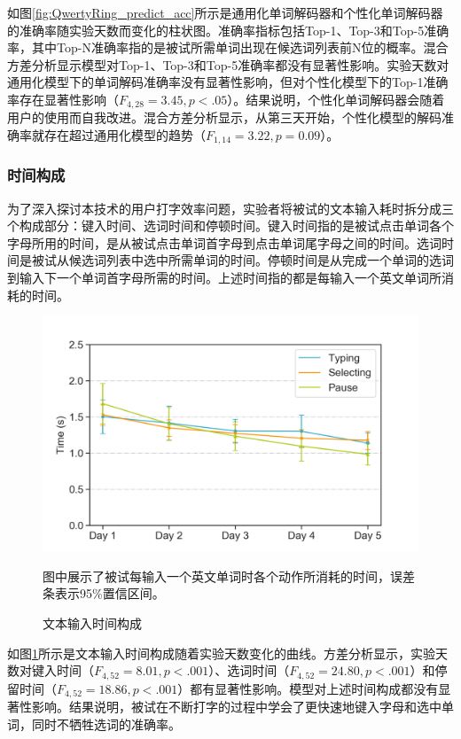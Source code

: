 如图\ref{fig:QwertyRing_predict_acc}所示是通用化单词解码器和个性化单词解码器的准确率随实验天数而变化的柱状图。准确率指标包括Top-1、Top-3和Top-5准确率，其中Top-N准确率指的是被试所需单词出现在候选词列表前N位的概率。混合方差分析显示模型对Top-1、Top-3和Top-5准确率都没有显著性影响。实验天数对通用化模型下的单词解码准确率没有显著性影响，但对个性化模型下的Top-1准确率存在显著性影响（$F_{4,28}=3.45,p<.05$）。结果说明，个性化单词解码器会随着用户的使用而自我改进。混合方差分析显示，从第三天开始，个性化模型的解码准确率就存在超过通用化模型的趋势（$F_{1,14}=3.22,p=0.09$）。

\subsubsection{时间构成}

为了深入探讨本技术的用户打字效率问题，实验者将被试的文本输入耗时拆分成三个构成部分：键入时间、选词时间和停顿时间。键入时间指的是被试点击单词各个字母所用的时间，是从被试点击单词首字母到点击单词尾字母之间的时间。选词时间是被试从候选词列表中选中所需单词的时间。停顿时间是从完成一个单词的选词到输入下一个单词首字母所需的时间。上述时间指的都是每输入一个英文单词所消耗的时间。

\begin{figure}[!htbp]
	\centering
	\includegraphics[width=0.8\linewidth]{figures/QwertyRing_time_component.png}
	\caption*{图中展示了被试每输入一个英文单词时各个动作所消耗的时间，误差条表示95\%置信区间。}
	\caption{文本输入时间构成}
	\label{fig:QwertyRing_time_component}
\end{figure}

如图\ref{fig:QwertyRing_time_component}所示是文本输入时间构成随着实验天数变化的曲线。方差分析显示，实验天数对键入时间（$F_{4,52}=8.01,p<.001$）、选词时间（$F_{4,52}=24.80,p<.001$）和停留时间（$F_{4,52}=18.86,p<.001$）都有显著性影响。模型对上述时间构成都没有显著性影响。结果说明，被试在不断打字的过程中学会了更快速地键入字母和选中单词，同时不牺牲选词的准确率。


